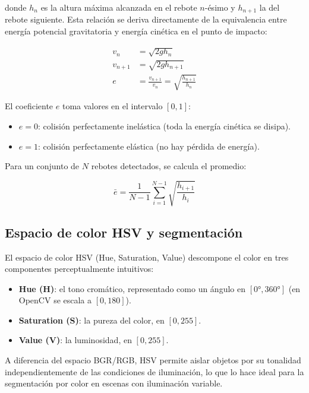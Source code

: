 \documentclass[12pt,a4paper]{article}
\begin{document}
donde $h_n$ es la altura máxima alcanzada en el rebote $n$-ésimo y $h_{n+1}$ la del rebote siguiente. Esta relación se deriva directamente de la equivalencia entre energía potencial gravitatoria y energía cinética en el punto de impacto:

\begin{align}
    v_n &= \sqrt{2 g h_n} \\
    v_{n+1} &= \sqrt{2 g h_{n+1}} \\
    e &= \frac{v_{n+1}}{v_n} = \sqrt{\frac{h_{n+1}}{h_n}}
\end{align}

El coeficiente $e$ toma valores en el intervalo $[0, 1]$:
\begin{itemize}
    \item $e = 0$: colisión perfectamente inelástica (toda la energía cinética se disipa).
    \item $e = 1$: colisión perfectamente elástica (no hay pérdida de energía).
\end{itemize}

Para un conjunto de $N$ rebotes detectados, se calcula el promedio:

\begin{equation}
    \bar{e} = \frac{1}{N-1} \sum_{i=1}^{N-1} \sqrt{\frac{h_{i+1}}{h_i}}
\end{equation}

\subsection{Espacio de color HSV y segmentación}

El espacio de color HSV (Hue, Saturation, Value) descompone el color en tres componentes perceptualmente intuitivos:

\begin{itemize}
    \item \textbf{Hue (H)}: el tono cromático, representado como un ángulo en $[0°, 360°]$ (en OpenCV se escala a $[0, 180]$).
    \item \textbf{Saturation (S)}: la pureza del color, en $[0, 255]$.
    \item \textbf{Value (V)}: la luminosidad, en $[0, 255]$.
\end{itemize}

A diferencia del espacio BGR/RGB, HSV permite aislar objetos por su tonalidad independientemente de las condiciones de iluminación, lo que lo hace ideal para la segmentación por color en escenas con iluminación variable.
\end{document}

